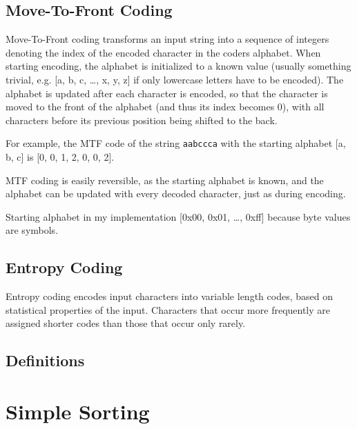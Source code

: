 \documentclass[a4paper]{scrreprt}
\begin{document}

\section{Move-To-Front Coding}

Move-To-Front coding transforms an input string into a sequence of integers
denoting the index of the encoded character in the coders alphabet. When
starting encoding, the alphabet is initialized to a known value (usually
something trivial, e.g. [a, b, c, \ldots, x, y, z] if only lowercase letters
have to be encoded). The alphabet is updated after each character is encoded, so
that the character is moved to the front of the alphabet (and thus its index
becomes 0), with all characters before its previous position being shifted to
the back.

For example, the MTF code of the string \texttt{aabccca} with the starting
alphabet [a, b, c] is [0, 0, 1, 2, 0, 0, 2].

MTF coding is easily reversible, as the starting alphabet is known, and the
alphabet can be updated with every decoded character, just as during encoding.

Starting alphabet in my implementation [0x00, 0x01, \ldots, 0xff] because byte
values are symbols.

\section{Entropy Coding}

Entropy coding encodes input characters into variable length codes, based on
statistical properties of the input. Characters that occur more frequently are
assigned shorter codes than those that occur only rarely.


\section{Definitions}

\chapter{Simple Sorting}
\end{document}
